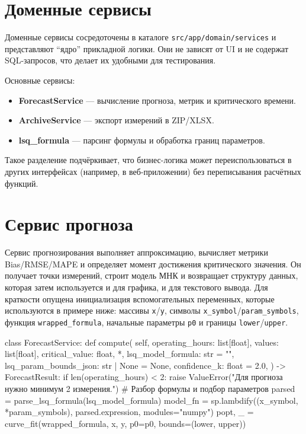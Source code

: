 \documentclass[12pt,a4paper]{article}
\begin{document}
\section*{Доменные сервисы}
Доменные сервисы сосредоточены в каталоге \texttt{src/app/domain/services} и
представляют ``ядро'' прикладной логики. Они не зависят от UI и не содержат
SQL-запросов, что делает их удобными для тестирования.

Основные сервисы:
\begin{itemize}
  \item \textbf{ForecastService} --- вычисление прогноза, метрик и критического времени.
  \item \textbf{ArchiveService} --- экспорт измерений в ZIP/XLSX.
  \item \textbf{lsq\_formula} --- парсинг формулы и обработка границ параметров.
\end{itemize}
Такое разделение подчёркивает, что бизнес-логика может переиспользоваться
в других интерфейсах (например, в веб-приложении) без переписывания расчётных функций.

\section*{Сервис прогноза}
Сервис прогнозирования выполняет аппроксимацию, вычисляет метрики Bias/RMSE/MAPE
и определяет момент достижения критического значения.
Он получает точки измерений, строит модель МНК и возвращает структуру данных,
которая затем используется и для графика, и для текстового вывода.
Для краткости опущена инициализация вспомогательных переменных, которые
используются в примере ниже: массивы \texttt{x}/\texttt{y}, символы
\texttt{x\_symbol}/\texttt{param\_symbols}, функция \texttt{wrapped\_formula},
начальные параметры \texttt{p0} и границы \texttt{lower}/\texttt{upper}.
\begin{codeblock}
class ForecastService:
    def compute(
        self,
        operating_hours: list[float],
        values: list[float],
        critical_value: float,
        *,
        lsq_model_formula: str = "",
        lsq_param_bounds_json: str | None = None,
        confidence_k: float = 2.0,
    ) -> ForecastResult:
        if len(operating_hours) < 2:
            raise ValueError("Для прогноза нужно минимум 2 измерения.")
        # Разбор формулы и подбор параметров
        parsed = parse_lsq_formula(lsq_model_formula)
        model_fn = sp.lambdify((x_symbol, *param_symbols), parsed.expression, modules="numpy")
        popt, _ = curve_fit(wrapped_formula, x, y, p0=p0, bounds=(lower, upper))
\end{codeblock}
\end{document}
